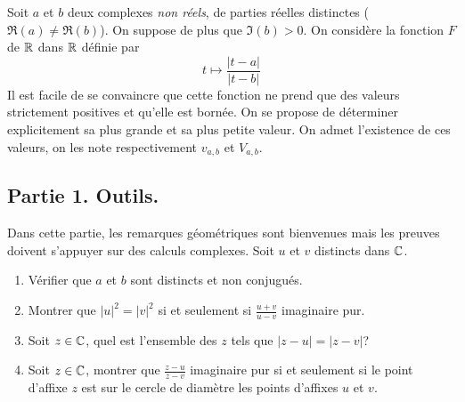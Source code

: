 Soit $a$ et $b$ deux complexes \emph{non réels}, de parties réelles distinctes ($\Re(a)\neq \Re(b)$). On suppose de plus que $\Im(b)>0$. On considère la fonction $F$ de $\mathbb{R}$ dans $\mathbb{R}$ définie par
\begin{displaymath}
  t \mapsto \frac{|t-a|}{|t-b|}
\end{displaymath}
Il est facile de se convaincre que cette fonction ne prend que des valeurs strictement positives et qu'elle est bornée. On se propose de déterminer explicitement sa plus grande et sa plus petite valeur. On admet l'existence de ces valeurs, on les note respectivement $v_{a,b}$ et $V_{a,b}$.
\subsection*{Partie 1. Outils.}
Dans cette partie, les remarques géométriques sont bienvenues mais les preuves doivent s'appuyer sur des calculs complexes. Soit $u$ et $v$ distincts dans $\mathbb{C}$. 
\begin{enumerate}
  \item Vérifier que $a$ et $b$ sont distincts et non conjugués.
  \item Montrer que $|u|^2=|v|^2$ si et seulement si $\frac{u+v}{u-v}$ imaginaire pur.
  \item Soit $z\in \mathbb{C}$, quel est l'ensemble des $z$ tels que $|z-u|=|z-v|$?
  \item Soit $z\in \mathbb{C}$, montrer que $\frac{z-u}{z-v}$ imaginaire pur si et seulement si le point d'affixe $z$ est sur le cercle de diamètre les points d'affixes $u$ et $v$.
\end{enumerate}

